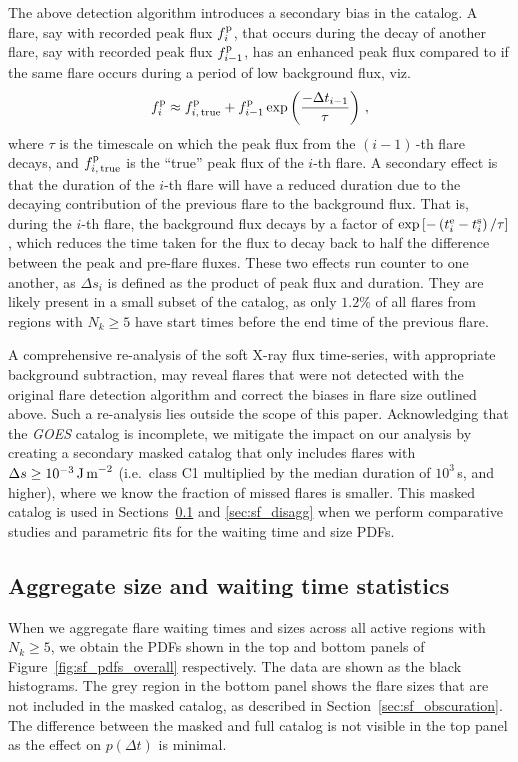 The above detection algorithm introduces a secondary bias in the catalog. A flare, say with recorded peak flux $f^{\rm p}_i$, that occurs during the decay of another flare, say with recorded peak flux $f^{\rm p}_{i-1}$, has an enhanced peak flux compared to if the same flare occurs during a period of low background flux, viz.  
\begin{equation}
f^{\rm p}_i \approx f^{\rm p}_{i,\,\textrm{true}} + f^{\rm p}_{i-1}\exp\left(\frac{-\Delta t_{i-1}}{\tau}\right)\,,
\end{equation}
where $\tau$ is the timescale on which the peak flux from the $(i-1)\,$-th flare decays, and $f^{\rm p}_{i,\,\textrm{true}}$ is the ``true'' peak flux of the $i$-th flare. A secondary effect is that the duration of the $i$-th flare will have a reduced duration due to the decaying contribution of the previous flare to the background flux. That is, during the $i$-th flare, the background flux decays by a factor of $\exp\left[-\left(t^{\rm e}_i - t^{\rm s}_i\right) / \tau\right]$, which reduces the time taken for the flux to decay back to half the difference between the peak and pre-flare fluxes. These two effects run counter to one another, as $\Delta s_i$ is defined as the product of peak flux and duration. They are likely present in a small subset of the catalog, as only $1.2\%$ of all flares from regions with $N_k \geq 5$ have start times before the end time of the previous flare.

A comprehensive re-analysis of the soft X-ray flux time-series, with appropriate background subtraction, may reveal flares that were not detected with the original flare detection algorithm and correct the biases in flare size outlined above. Such a re-analysis lies outside the scope of this paper. Acknowledging that the \emph{GOES} catalog is incomplete, we mitigate the impact on our analysis by creating a secondary masked catalog that only includes flares with $\Delta s \geq 10^{-3}\textrm{\,J\,m}^{-2}$ (i.e.~class C1 multiplied by the median duration of $10^3\,$s, and higher), where we know the fraction of missed flares is smaller. This masked catalog is used in Sections~\ref{sec:sf_agg} and \ref{sec:sf_disagg} when we perform comparative studies and parametric fits for the waiting time and size PDFs. 

\subsection{Aggregate size and waiting time statistics} \label{sec:sf_agg}
When we aggregate flare waiting times and sizes across all active regions with $N_k \geq 5$, we obtain the PDFs shown in the top and bottom panels of Figure~\ref{fig:sf_pdfs_overall} respectively. The data are shown as the black histograms. The grey region in the bottom panel shows the flare sizes that are not included in the masked catalog, as described in Section~\ref{sec:sf_obscuration}. The difference between the masked and full catalog is not visible in the top panel as the effect on $p(\Delta t)$ is minimal. 

